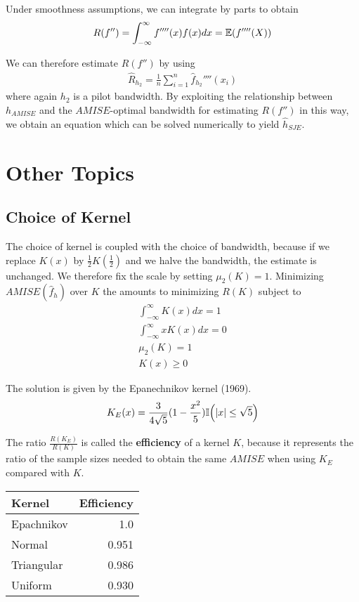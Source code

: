 Under smoothness assumptions, we can integrate by parts to obtain
\begin{align}
  \label{eq:37}
  R(f'') = \int_{-\infty}^{\infty} f''''(x) f(x) dx = \E{f''''(X)}
\end{align}

We can therefore estimate $R(f'')$ by using
\begin{align}
  \label{eq:38}
  \hat R_{h_{2}} = \frac{1}{n} \sum_{i=1}^{n} \hat
  f_{h_{2}}''''(x_{i})
\end{align} where again $h_{2}$ is a pilot bandwidth.  By exploiting
the relationship between $h_{AMISE}$ and the $AMISE$-optimal bandwidth
for estimating $R(f'')$ in this way, we obtain an equation which can
be solved numerically to yield $\hat h_{SJE}$.


\section{Other Topics}
\label{sec:other-topics}

\subsection{Choice of Kernel}
\label{sec:choice-kernel}

The choice of kernel is coupled with the choice of bandwidth, because
if we replace $K(x)$ by $\frac{1}{2} K(\frac{1}{2})$ and we halve the
bandwidth, the estimate is unchanged.  We therefore fix the scale by
setting $\mu_{2}(K) = 1$.  Minimizing $AMISE(\hat f_{h})$ over $K$ the
amounts to minimizing $R(K)$ subject to
\begin{align}
  \label{eq:40}
  \int_{-\infty}^{\infty} K(x) dx = 1 \\
  \int_{-\infty}^{\infty} x K(x) dx = 0 \\
  \mu_{2}(K) = 1 \\
  K(x) \geq 0
\end{align}

The solution is given by the Epanechnikov kernel (1969).
\begin{align}
  \label{eq:41}
  K_{E}(x) = \frac{3}{4 \sqrt{5}}(1 - \frac{x^{2}}{5}) \I{|x| \leq \sqrt{5}}
\end{align}

The ratio $\frac{R(K_{E})}{R(K)}$ is called the \textbf{efficiency} of
a kernel $K$, because it represents the ratio of the sample sizes
needed to obtain the same $AMISE$ when using $K_{E}$ compared with $K$.


\begin{center}
\begin{tabular}{lr}
Kernel & Efficiency \\
\hline
Epachnikov & 1.0 \\
Normal & 0.951 \\
Triangular & 0.986 \\
Uniform & 0.930 \\
\end{tabular}
\end{center}

